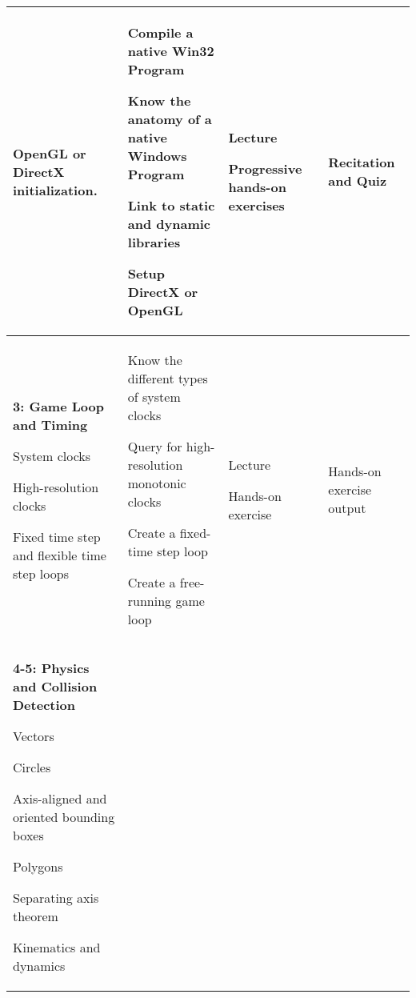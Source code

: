 \documentclass[10pt]{article}
\newenvironment{itemize*}{
\begin{itemize}[leftmargin=1em,noitemsep,nolistsep]
}{\end{itemize}}
\begin{document}
\begin{longtable}{||p{1.8in}|p{2.4in}|p{1.3in}|p{1in}||}
\begin{itemize*}
	 \item OpenGL or DirectX initialization.
	\end{itemize*} &
	\begin{itemize*}
		\item Compile a native Win32 Program
		\item Know the anatomy of a native Windows Program
		\item Link to static and dynamic libraries
		\item Setup DirectX or OpenGL
	\end{itemize*} &
	\begin{itemize*}
		\item Lecture
		\item Progressive hands-on exercises
	\end{itemize*} & Recitation and Quiz\\ \hline
\textbf{3: Game Loop and Timing}
	\begin{itemize*}
		\item System clocks
		\item High-resolution clocks
		\item Fixed time step and flexible time step loops
	\end{itemize*} &
	\begin{itemize*}
		\item Know the different types of system clocks
		\item Query for high-resolution monotonic clocks
		\item Create a fixed-time step loop
		\item Create a free-running game loop
	\end{itemize*} &
	\begin{itemize*}
		\item Lecture
		\item Hands-on exercise
	\end{itemize*} & Hands-on exercise output \\ \hline
\textbf{4-5: Physics and Collision Detection} 
	\begin{itemize*}
		\item Vectors
		\item Circles
		\item Axis-aligned and oriented bounding boxes
		\item Polygons
		\item Separating axis theorem
		\item Kinematics and dynamics
	\end{itemize*} &

\end{longtable}
\end{document}
